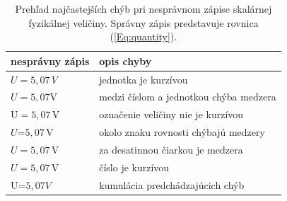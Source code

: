 \documentclass[../../../thesis.tex]{subfiles}
\begin{document}
\begin{table}[h]
\centering
\caption{Prehľad najčastejších chýb pri nesprávnom zápise
skalárnej fyzikálnej veličiny.
Správny zápis predstavuje rovnica (\ref{Eq:quantity}).}
\vspace{12pt}
\begin{tabular}{@{}ll@{}}
  \toprule
  \textbf{nesprávny zápis} & \textbf{opis chyby}\\
  \midrule
  $U = 5{,}07\,V$ & jednotka je kurzívou\\
  $U = 5{,}07\mathrm V$ & medzi číslom a jednotkou chýba medzera\\
  $\mathrm U = 5{,}07\,\mathrm V$ & označenie veličiny nie je kurzívou \\
  $U$=$5{,}07\,\mathrm V$ & okolo znaku rovnosti chýbajú medzery\\
  $U = 5,07\,\mathrm{V}$ & za desatinnou čiarkou je medzera\\
  $U = \mathit{5{,}07}\,\mathrm{V}$ & číslo je kurzívou\\
  U=$\mathit{5,07}V$ & kumulácia predchádzajúcich chýb\\
  \bottomrule
\end{tabular}
\end{table}
\end{document}
